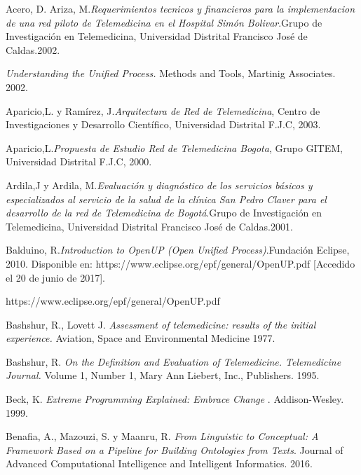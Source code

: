 \begin{thebibliography}{}

 Acero, D. Ariza, M.\textit{Requerimientos tecnicos y financieros para la implementacion de una red piloto de Telemedicina en el Hospital Simón Bolivar}.Grupo de Investigación en Telemedicina,  Universidad Distrital Francisco José de Caldas.2002.

 \textit{Understanding the Unified Process.} Methods and Tools, Martinig Associates. 2002.

 Aparicio,L. y Ramírez, J.\textit{Arquitectura de Red de Telemedicina}, Centro de Investigaciones y Desarrollo Científico, Universidad Distrital F.J.C, 2003.

 Aparicio,L.\textit{Propuesta de Estudio Red de Telemedicina Bogota}, Grupo GITEM, Universidad Distrital F.J.C, 2000.

 Ardila,J y Ardila, M.\textit{Evaluación y diagnóstico de los servicios básicos y especializados al servicio de la salud de la clínica San Pedro Claver para el desarrollo de la red de Telemedicina de Bogotá}.Grupo de Investigación en Telemedicina,  Universidad Distrital Francisco José de Caldas.2001.

 Balduino, R.\textit{Introduction to OpenUP (Open Unified Process)}.Fundación Eclipse, 2010. Disponible en: https://www.eclipse.org/epf/general/OpenUP.pdf [Accedido el 20 de junio de 2017].


https://www.eclipse.org/epf/general/OpenUP.pdf

 Bashshur, R., Lovett J. \textit{Assessment of telemedicine: results of the initial experience.} Aviation, Space and Environmental Medicine 1977.

 Bashshur, R. \textit{On the Definition and Evaluation of Telemedicine. Telemedicine Journal.} Volume 1, Number 1, Mary Ann Liebert, Inc., Publishers. 1995.

 Beck, K. \textit{ Extreme Programming Explained: Embrace Change }. Addison-Wesley. 1999.

 Benafia, A., Mazouzi, S. y Maanru, R. \textit{From Linguistic to Conceptual: A Framework Based on a Pipeline for Building Ontologies from Texts}. Journal of Advanced Computational Intelligence and Intelligent Informatics. 2016.


\end{thebibliography}
